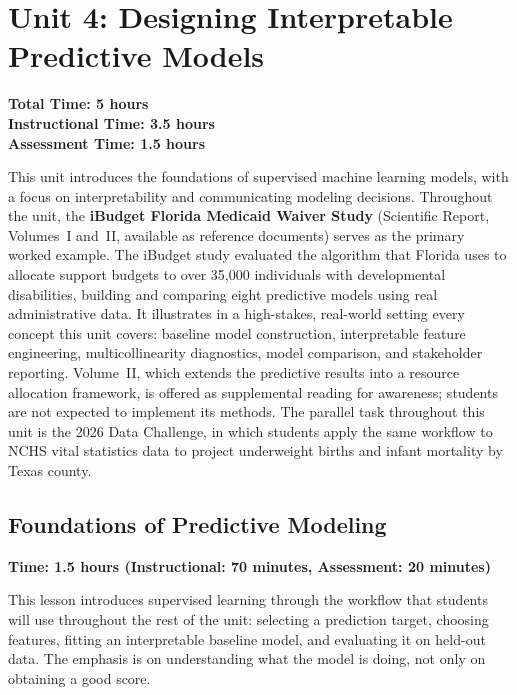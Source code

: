 \chapter{Unit 4: Designing Interpretable Predictive Models}
\label{chap:unit4}

\textbf{Total Time: 5 hours} \\
\textbf{Instructional Time: 3.5 hours} \\
\textbf{Assessment Time: 1.5 hours}

This unit introduces the foundations of supervised machine learning
models, with a focus on interpretability and communicating modeling
decisions. Throughout the unit, the \textbf{iBudget Florida Medicaid
Waiver Study} (Scientific Report, Volumes~I and~II, available as
reference documents) serves as the primary worked example. The
iBudget study evaluated the algorithm that Florida uses to allocate
support budgets to over 35,000 individuals with developmental
disabilities, building and comparing eight predictive models using
real administrative data. It illustrates in a high-stakes, real-world
setting every concept this unit covers: baseline model construction,
interpretable feature engineering, multicollinearity diagnostics,
model comparison, and stakeholder reporting. Volume~II, which extends
the predictive results into a resource allocation framework, is offered
as supplemental reading for awareness; students are not expected to
implement its methods. The parallel task throughout this unit is the
2026 Data Challenge, in which students apply the same workflow to NCHS
vital statistics data to project underweight births and infant
mortality by Texas county.

\section{Foundations of Predictive Modeling}
\label{sec:4.1}

\textbf{Time: 1.5 hours (Instructional: 70 minutes, Assessment:
20 minutes)}

\noindent This lesson introduces supervised learning through the
workflow that students will use throughout the rest of the unit:
selecting a prediction target, choosing features, fitting an
interpretable baseline model, and evaluating it on held-out data.
The emphasis is on understanding what the model is doing, not only
on obtaining a good score.

